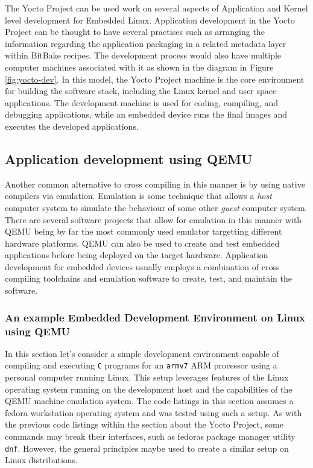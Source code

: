 The Yocto Project can be used work on several aspects of Application and Kernel level development for Embedded Linux. Application development in the Yocto Project can be thought to have several practises such as arranging the information regarding the application packaging in a related metadata layer within BitBake recipes. The development process would also have multiple computer machines associated with it as shown in the diagram in Figure \ref{fig:yocto-dev}. In this model, the Yocto Project machine is the core environment for building the software stack, including the Linux kernel and user space applications. The development machine is used for coding, compiling, and debugging applications, while an embedded device runs the final images and executes the developed applications.

\subsection{Application development using QEMU}

Another common alternative to cross compiling in this manner is by using native compilers via emulation. Emulation is some technique that allows a \textit{host} computer system to simulate the behaviour of some other \textit{guest} computer system. There are several software projects that allow for emulation in this manner with QEMU being by far the most commonly used emulator targetting different hardware platforms. QEMU can also be used to create and test embedded applications before being deployed on the target hardware. Application development for embedded devices usually employs a combination of cross compiling toolchains and emulation software to create, test, and maintain the software.

\subsubsection{An example Embedded Development Environment on Linux using QEMU}

In this section let's consider a simple development environment capable of compiling and executing \texttt{C} programs for an \texttt{armv7} ARM processor using a personal computer running Linux. This setup leverages features of the Linux operating system running on the development host and the capabilities of the QEMU machine emulation system. The code listings in this section assumes a fedora workstation operating system and was tested using such a setup. As with the previous code listings within the section about the Yocto Project, some commands may break their interfaces, such as fedora\textquotesingle s package manager utility \texttt{dnf}. However, the general principles maybe used to create a similar setup on Linux distributions.

